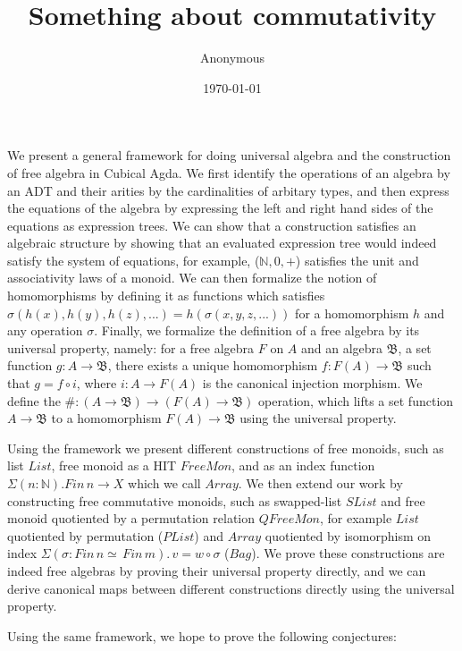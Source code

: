 \documentclass{article}
\title{Something about commutativity}
\author{Anonymous}
\date{\today}
\begin{document}
\maketitle

We present a general framework for doing universal algebra and the construction of
free algebra in Cubical Agda. We first identify the operations of an algebra by an ADT and their
arities by the cardinalities of arbitary types, and then express the equations of the algebra
by expressing the left and right hand sides of the equations as expression trees. We can
show that a construction satisfies an algebraic structure by showing that an evaluated expression
tree would indeed satisfy the system of equations, for example, ($\mathbb{N},0,+$) satisfies the
unit and associativity laws of a monoid. We can then formalize the notion of homomorphisms by 
defining it as functions which satisfies $\sigma(h(x),h(y),h(z),...) = h(\sigma(x,y,z,...))$ for
a homomorphism $h$ and any operation $\sigma$. Finally, we formalize the definition of a free algebra
by its universal property, namely: for a free algebra $F$ on $A$ and an algebra $\mathfrak{B}$, a set function 
$g : A \rightarrow \mathfrak{B}$, there exists a unique homomorphism $f : F(A) \rightarrow \mathfrak{B}$ such that
$g = f \circ i$, where $i : A \rightarrow F(A)$ is the canonical injection morphism.
We define the $\# : (A \rightarrow \mathfrak{B}) \rightarrow (F(A) \rightarrow \mathfrak{B})$ operation, which lifts
a set function $A \rightarrow \mathfrak{B}$ to a homomorphism $F(A) \rightarrow \mathfrak{B}$ using the universal property.

Using the framework we present different constructions of free monoids,
such as list $List$, free monoid as a HIT $FreeMon$, and as an index function $\Sigma (n : \mathbb{N}). Fin \, n \rightarrow X$ which we call $Array$.
We then extend our work by constructing free commutative monoids,
such as swapped-list $SList$ and free monoid quotiented by a permutation relation $QFreeMon$,
for example $List$ quotiented by permutation ($PList$)
and $Array$ quotiented by isomorphism on index $\Sigma (\sigma : Fin \, n \simeq \, Fin \, m). \, v = w \circ \sigma$ ($Bag$).
We prove these constructions are indeed free algebras by proving their universal property directly,
and we can derive canonical maps between different constructions directly using the universal property.

Using the same framework, we hope to prove the following conjectures:

\newtheorem{myconj}{Conjecture}
\newtheorem{mydef}{Definition}
\newtheorem{mylemma}{Lemma}
\newtheorem{mythm}{Theorem}
\end{document}
